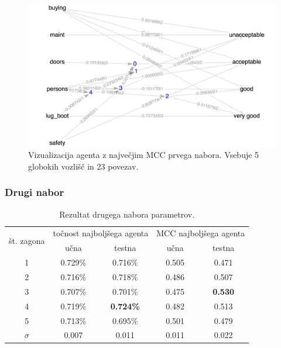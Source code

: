 \begin{figure}[H]
    \begin{center}
        \includegraphics[width=13cm]{car/1/mcc_g}
    \end{center}
    \caption{Vizualizacija agenta z največjim MCC prvega nabora. Vsebuje 5 globokih vozlišč in 23 povezav.}
    \label{fig:car_mcc_1_g}
\end{figure}

\subsubsection{Drugi nabor}
\begin{table}[H]
    \caption{Rezultat drugega nabora parametrov.}
    \begin{center}
        \begin{tabular}{|| c | c c || c c ||}
            \hline
            \multirow{2}{*}{št. zagona} & \multicolumn{2}{c||}{točnost najboljšega agenta} & \multicolumn{2}{c||}{MCC najboljšega agenta} \\ \cline{2-5}
            & učna    & testna           & učna  & testna         \\
            \hline
            1        & 0.729\% & 0.716\%          & 0.505 & 0.471          \\
            \hline
            2        & 0.716\% & 0.718\%          & 0.486 & 0.507          \\
            \hline
            3        & 0.707\% & 0.701\%          & 0.475 & \textbf{0.530} \\
            \hline
            4        & 0.719\% & \textbf{0.724\%} & 0.482 & 0.513          \\
            \hline
            5        & 0.713\% & 0.695\%          & 0.501 & 0.479          \\
            \hline
            $\sigma$ & 0.007   & 0.011            & 0.011 & 0.022          \\
            \hline
        \end{tabular}
    \end{center}
    \label{tab:car_result_2}
\end{table}

